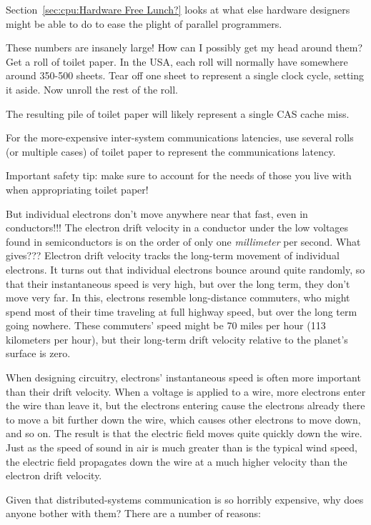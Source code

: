 	Section~\ref{sec:cpu:Hardware Free Lunch?}
	looks at what else hardware designers might be
	able to do to ease the plight of parallel programmers.

\QuickQ{}
	These numbers are insanely large!
	How can I possibly get my head around them?
\QuickA{}
	Get a roll of toilet paper.
	In the USA, each roll will normally have somewhere around 350-500
	sheets.
	Tear off one sheet to represent a single clock cycle, setting it aside.
	Now unroll the rest of the roll.

	The resulting pile of toilet paper will likely represent a single
	CAS cache miss.

	For the more-expensive inter-system communications latencies,
	use several rolls (or multiple cases) of toilet paper to represent
	the communications latency.

	Important safety tip: make sure to account for the needs of
	those you live with when appropriating toilet paper!

\QuickQ{}
	But individual electrons don't move anywhere near that fast,
	even in conductors!!!
	The electron drift velocity in a conductor under the low voltages
	found in semiconductors is on the order of only one \emph{millimeter}
	per second.
	What gives???
\QuickA{}
	Electron drift velocity tracks the long-term movement of individual
	electrons.
	It turns out that individual electrons bounce around quite
	randomly, so that their instantaneous speed is very high, but
	over the long term, they don't move very far.
	In this, electrons resemble long-distance commuters, who
	might spend most of their time traveling at full highway
	speed, but over the long term going nowhere.
	These commuters' speed might be 70 miles per hour
	(113 kilometers per hour), but their long-term drift velocity
	relative to the planet's surface is zero.

	When designing circuitry, electrons' instantaneous speed is
	often more important than their drift velocity.
	When a voltage is applied to a wire, more electrons enter the
	wire than leave it, but the electrons entering cause the
	electrons already there to move a bit further down the wire,
	which causes other electrons to move down, and so on.
	The result is that the electric field moves quite quickly down
	the wire.
	Just as the speed of sound in air is much greater than is
	the typical wind speed, the electric field propagates down
	the wire at a much higher velocity than the electron drift
	velocity.

\QuickQ{}
	Given that distributed-systems communication is so horribly
	expensive, why does anyone bother with them?
\QuickA{}
	There are a number of reasons:

